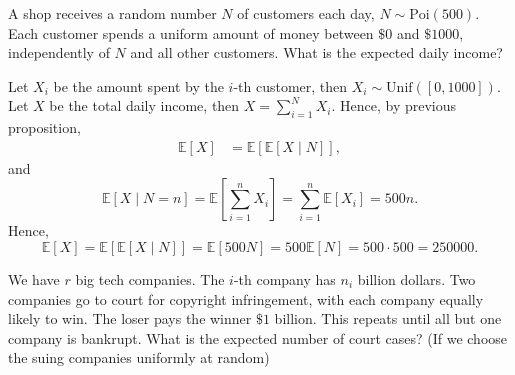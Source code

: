 \begin{eg}
    A shop receives a random number \(N\) of customers each day, \(N \sim \mathrm{Poi}(500) \). Each customer spends a uniform amount of money between \(\$ 0\) and \(\$ 1000\), independently of \(N\) and all other customers. What is the expected daily income?    
\end{eg}

\begin{explanation}
    Let \(X_i\) be the amount spent by the \(i\)-th customer, then \(X_i \sim \mathrm{Unif}([0, 1000]) \). Let \(X\) be the total daily income, then \(X = \sum_{i=1}^N X_i \). Hence, by previous proposition,
    \begin{align*}
        \mathbb{E} [X] &= \mathbb{E} [\mathbb{E} [X \mid N]],
    \end{align*}
    and 
    \[
        \mathbb{E} [X \mid N = n] = \mathbb{E} \left[ \sum_{i=1}^n X_i  \right]  = \sum_{i=1}^n \mathbb{E} [X_i] = 500n. 
    \]
    Hence,
    \[
        \mathbb{E} [X] = \mathbb{E} [\mathbb{E} [X \mid N]] = \mathbb{E} [500 N] = 500 \mathbb{E} [N] = 500 \cdot 500 = 250000.
    \]
\end{explanation}

\begin{eg}
    We have \(r\) big tech companies. The \(i\)-th company has \(n_i\) billion dollars. Two companies go to court for copyright infringement, with each company equally likely to win. The loser pays the winner \(\$ 1\) billion. This repeats until all but one company is bankrupt. What is the expected number of court cases? (If we choose the suing companies uniformly at random) 
\end{eg}

